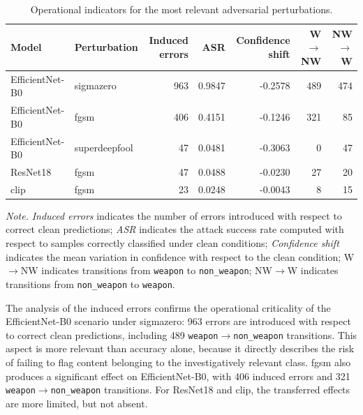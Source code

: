\begin{table}[H]
\centering
\scriptsize
\setlength{\tabcolsep}{3.5pt}
\renewcommand{\arraystretch}{1.15}
\caption{Operational indicators for the most relevant adversarial perturbations.}
\label{tab:results-adversarial-operational-errors}
\begin{tabular}{@{}l l r r r r r@{}}
\toprule
\textbf{Model} &
\textbf{Perturbation} &
\textbf{Induced errors} &
\textbf{ASR} &
\textbf{Confidence shift} &
\textbf{W\(\rightarrow\)NW} &
\textbf{NW\(\rightarrow\)W} \\
\midrule
EfficientNet-B0 & \gls{sigmazero} & 963 & 0.9847 & -0.2578 & 489 & 474 \\
EfficientNet-B0 & \gls{fgsm} & 406 & 0.4151 & -0.1246 & 321 & 85 \\
EfficientNet-B0 & \gls{superdeepfool} & 47 & 0.0481 & -0.3063 & 0 & 47 \\
ResNet18 & \gls{fgsm} & 47 & 0.0488 & -0.0230 & 27 & 20 \\
\acrshort{clip} & \gls{fgsm} & 23 & 0.0248 & -0.0043 & 8 & 15 \\
\bottomrule
\end{tabular}

\vspace{0.4em}
\footnotesize
\textit{Note.} \textit{Induced errors} indicates the number of errors introduced
with respect to correct clean predictions; \textit{ASR} indicates the attack
success rate computed with respect to samples correctly classified under clean
conditions; \textit{Confidence shift} indicates the mean variation in
confidence with respect to the clean condition; W\(\rightarrow\)NW indicates
transitions from \texttt{weapon} to \texttt{non\_weapon}; NW\(\rightarrow\)W
indicates transitions from \texttt{non\_weapon} to \texttt{weapon}.
\end{table}

The analysis of the induced errors confirms the operational criticality of the
EfficientNet-B0 scenario under \gls{sigmazero}: 963 errors are introduced with
respect to correct clean predictions, including 489
\texttt{weapon}\(\rightarrow\)\texttt{non\_weapon} transitions. This aspect is
more relevant than accuracy alone, because it directly describes the risk of
failing to flag content belonging to the investigatively relevant class.
\gls{fgsm} also produces a significant effect on EfficientNet-B0, with 406
induced errors and 321 \texttt{weapon}\(\rightarrow\)\texttt{non\_weapon}
transitions. For ResNet18 and \gls{clip}, the transferred effects are more
limited, but not absent.

